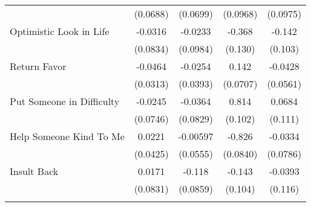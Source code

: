 {\begin{tabular}{l*{4}{c}}
            &    (0.0688)         &    (0.0699)         &    (0.0968)         &    (0.0975)         \\
[1em]
Optimistic Look in Life&     -0.0316         &     -0.0233         &      -0.368\sym{**} &      -0.142         \\
            &    (0.0834)         &    (0.0984)         &     (0.130)         &     (0.103)         \\
[1em]
Return Favor&     -0.0464         &     -0.0254         &       0.142\sym{*}  &     -0.0428         \\
            &    (0.0313)         &    (0.0393)         &    (0.0707)         &    (0.0561)         \\
[1em]
Put Someone in Difficulty&     -0.0245         &     -0.0364         &       0.814\sym{***}&      0.0684         \\
            &    (0.0746)         &    (0.0829)         &     (0.102)         &     (0.111)         \\
[1em]
Help Someone Kind To Me&      0.0221         &    -0.00597         &      -0.826\sym{***}&     -0.0334         \\
            &    (0.0425)         &    (0.0555)         &    (0.0840)         &    (0.0786)         \\
[1em]
Insult Back &      0.0171         &      -0.118         &      -0.143         &     -0.0393         \\
            &    (0.0831)         &    (0.0859)         &     (0.104)         &     (0.116)         \\
\hline\hline
{}\\
\end{tabular}
}
